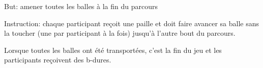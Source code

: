 \documentclass{grand-jeu}
\begin{document}
\begin{liste-materiel}
\end{liste-materiel}

\begin{regles}
But: amener toutes les balles à la fin du parcours

\vspace{0.2cm}

Instruction: chaque participant reçoit une paille et doit faire avancer sa balle sans la toucher (une par participant à la fois) jusqu’à l’autre bout du parcours.

Lorsque toutes les balles ont été transportées, c’est la fin du jeu et les participants reçoivent des b-dures. 
\end{regles}

\begin{imaginaire}
\end{imaginaire}

\begin{moments-stop}
\end{moments-stop}
\end{document}
